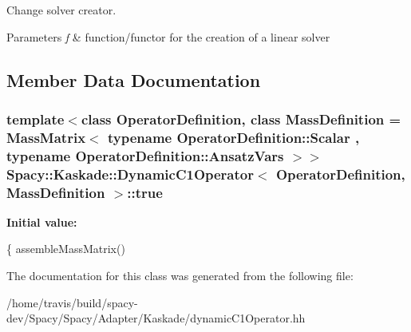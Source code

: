 Change solver creator. 


\begin{DoxyParams}{Parameters}
{\em f} & function/functor for the creation of a linear solver \\
\hline
\end{DoxyParams}


\subsection{Member Data Documentation}
\hypertarget{classSpacy_1_1Kaskade_1_1DynamicC1Operator_a7cf6af05de7bda2e80bc61a97423d597}{
\subsubsection[{true}]{\setlength{\rightskip}{0pt plus 5cm}template$<$class Operator\-Definition, class Mass\-Definition = Mass\-Matrix$<$ typename Operator\-Definition\-::\-Scalar , typename Operator\-Definition\-::\-Ansatz\-Vars $>$$>$ {\bf Spacy\-::\-Kaskade\-::\-Dynamic\-C1\-Operator}$<$ Operator\-Definition, Mass\-Definition $>$\-::true}}\label{classSpacy_1_1Kaskade_1_1DynamicC1Operator_a7cf6af05de7bda2e80bc61a97423d597}
{\bfseries Initial value\-:}
\begin{DoxyCode}
\{
        assembleMassMatrix()
\end{DoxyCode}


The documentation for this class was generated from the following file\-:\begin{DoxyCompactItemize}
\item 
/home/travis/build/spacy-\/dev/\-Spacy/\-Spacy/\-Adapter/\-Kaskade/dynamic\-C1\-Operator.\-hh\end{DoxyCompactItemize}
